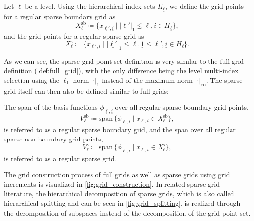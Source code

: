 \documentclass[
  a4paper,  %
  twoside,  %
  bibliography=totoc,
  headsepline,
  cleardoublepage=empty,
  parskip=half,
  draft=false
]{scrbook}
\begin{document}
\begin{definition}
Let $\ell$ be a level. Using the hierarchical index sets $H_{\underline{\ell}}$, we define the grid points for a regular sparse boundary grid as
\begin{equation}
X^{\mathrm{sb}}_{\ell} \coloneqq \{x_{\underline{\ell'},\underline{i}} \mid |\underline{\ell'}|_1 \leq \ell, \underline{i} \in H_{\underline{\ell}}\},
\end{equation}
and the grid points for a regular sparse grid as
\begin{equation}
X^{\mathrm{s}}_{\ell} \coloneqq \{x_{\underline{\ell'},\underline{i}} \mid |\underline{\ell'}|_1 \leq \ell, \underline{1} \leq \ell', \underline{i} \in H_{\underline{\ell}}\}.
\end{equation}
\end{definition}
%
As we can see, the sparse grid point set definition is very similar to the full grid definition (\cref{def:full_grid}), with the only difference being the level multi-index selection using the $\ell_1$ norm $|\cdot|_1$ instead of the maximum norm $|\cdot|_\infty$.
The sparse grid itself can then also be defined similar to full grids:
\begin{definition}
The span of the basis functions $\phi_{\underline{\ell},\underline{i}}$ over all regular sparse boundary grid points,
\begin{equation}
V^{\mathrm{sb}}_{\ell} \coloneqq \mathrm{span}~ \{\phi_{\underline{\ell},\underline{i}} \mid x_{\underline{\ell},\underline{i}} \in X^{\mathrm{sb}}_{\ell}\},
\end{equation}
is referred to as a regular sparse boundary grid, and the span over all regular sparse non-boundary grid points,
\begin{equation}
V^{\mathrm{s}}_{\ell} \coloneqq \mathrm{span}~ \{\phi_{\underline{\ell},\underline{i}} \mid x_{\underline{\ell},\underline{i}} \in X^{\mathrm{s}}_{\ell}\},
\label{eq:sparse_grid}
\end{equation}
is referred to as a regular sparse grid.
\label{def:sparse_grid}
\end{definition}
%
The grid construction process of full grids as well as sparse grids using grid increments is visualized in \cref{fig:grid_construction}.
In related sparse grid literature, the hierarchical decomposition of sparse grids, which is also called hierarchical splitting and can be seen in \cref{fig:grid_splitting}, is realized through the decomposition of subspaces instead of the decomposition of the grid point set.
\end{document}
